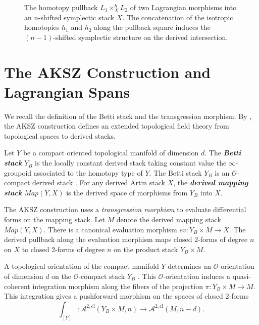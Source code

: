 \documentclass[reqno]{amsart}
\newcommand{\bfem}[1]{\textbf{\textit{#1}}}
\newcommand{\cO}{\mathcal{O}}
\begin{document}
\begin{figure}[htbp]
    \centering
    \caption{The homotopy pullback $L_{1} \times_{X}^{h} L_{2}$ of two Lagrangian morphisms into an $n$-shifted symplectic stack $X$. The concatenation of the isotropic homotopies $h_{1}$ and $h_{2}$ along the pullback square induces the $(n-1)$-shifted symplectic structure on the derived intersection.}
\end{figure}

\section{The AKSZ Construction and Lagrangian Spans}\label{sec:aksz}

We recall the definition of the Betti stack and the transgression morphism. By \cite[Section 1.3]{CHS}, the AKSZ construction defines an extended topological field theory from topological spaces to derived stacks. 

Let $Y$ be a compact oriented topological manifold of dimension $d$. The \bfem{Betti stack} $Y_{B}$ is the locally constant derived stack taking constant value the $\infty$-groupoid associated to the homotopy type of $Y$. The Betti stack $Y_B$ is an $\cO$-compact derived stack \cite[Section 2.1]{PTVV}. For any derived Artin stack $X$, the \bfem{derived mapping stack} $Map(Y, X)$ is the derived space of morphisms from $Y_{B}$ into $X$. 

The AKSZ construction uses a \textit{transgression morphism} to evaluate differential forms on the mapping stack. Let $M$ denote the derived mapping stack $Map(Y, X)$. There is a canonical evaluation morphism $ev \colon Y_{B} \times M \to X$. The derived pullback along the evaluation morphism maps closed 2-forms of degree $n$ on $X$ to closed 2-forms of degree $n$ on the product stack $Y_{B} \times M$.

A topological orientation of the compact manifold $Y$ determines an $\cO$-orientation of dimension $d$ on the $\cO$-compact stack $Y_{B}$ \cite[Section 2.1]{PTVV}. This $\cO$-orientation induces a quasi-coherent integration morphism along the fibers of the projection $\pi \colon Y_{B} \times M \to M$. This integration gives a pushforward morphism on the spaces of closed 2-forms \cite[Definition 2.3]{PTVV}
\[
    \int_{[Y]} \colon \mathcal{A}^{2, \mathrm{cl}}(Y_{B} \times M, n) \to \mathcal{A}^{2, \mathrm{cl}}(M, n-d).
\]
\end{document}
